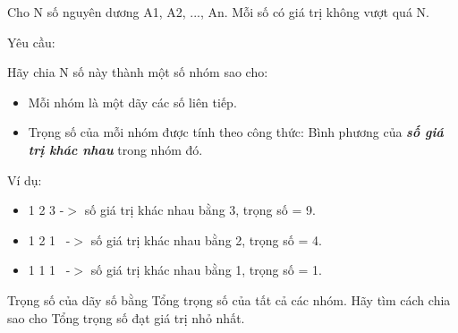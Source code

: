 Cho N số nguyên dương A1, A2, ..., An. Mỗi số có giá trị không vượt quá N.

Yêu cầu:

Hãy chia N số này thành một số nhóm sao cho:
\begin{itemize}
	\item Mỗi nhóm là một dãy các số liên tiếp.
	\item Trọng số của mỗi nhóm được tính theo công thức: Bình phương của \textbf{\emph{ số giá trị khác nhau }} trong nhóm đó.
\end{itemize}

Ví dụ:
\begin{itemize}
	\item 1 2 3 -$>$ số giá trị khác nhau bằng 3, trọng số = 9.
	\item 1 2 1  -$>$ số giá trị khác nhau bằng 2, trọng số = 4.
	\item 1 1 1  -$>$ số giá trị khác nhau bằng 1, trọng số = 1.
\end{itemize}

Trọng số của dãy số bằng Tổng trọng số của tất cả các nhóm. Hãy tìm cách chia sao cho Tổng trọng số đạt giá trị nhỏ nhất.

\
